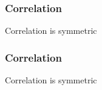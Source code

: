 \documentclass[handout]{beamer}
\begin{document}


   \begin{frame}
   \frametitle{Correlation}
   \begin{center}
   \end{center}
   Correlation is symmetric
   \end{frame}



   \begin{frame}
   \frametitle{Correlation}
   \begin{center}
   \end{center}
   Correlation is symmetric
   \end{frame}

\end{document}
